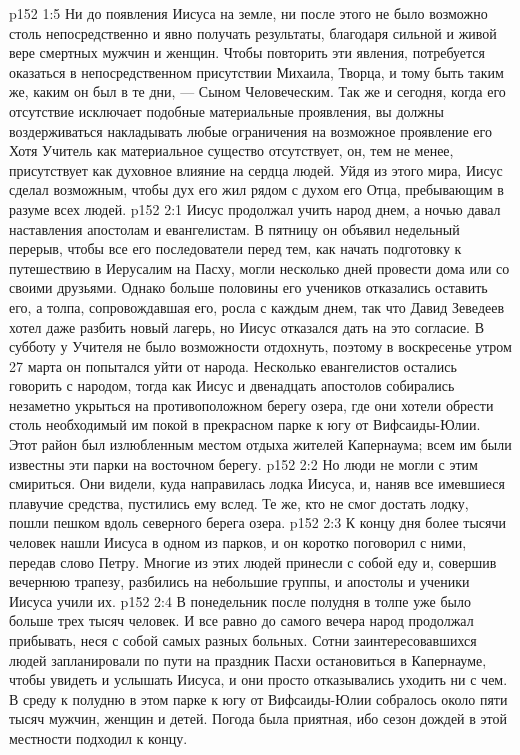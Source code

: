 \vs p152 1:5 Ни до появления Иисуса на земле, ни после этого не было возможно столь непосредственно и явно получать результаты, благодаря сильной и живой вере смертных мужчин и женщин. Чтобы повторить эти явления, потребуется оказаться в непосредственном присутствии Михаила, Творца, и тому быть таким же, каким он был в те дни, --- Сыном Человеческим. Так же и сегодня, когда его отсутствие исключает подобные материальные проявления, вы должны воздерживаться накладывать любые ограничения на возможное проявление его  Хотя Учитель как материальное существо отсутствует, он, тем не менее, присутствует как духовное влияние на сердца людей. Уйдя из этого мира, Иисус сделал возможным, чтобы дух его жил рядом с духом его Отца, пребывающим в разуме всех людей.
\vs p152 2:1 Иисус продолжал учить народ днем, а ночью давал наставления апостолам и евангелистам. В пятницу он объявил недельный перерыв, чтобы все его последователи перед тем, как начать подготовку к путешествию в Иерусалим на Пасху, могли несколько дней провести дома или со своими друзьями. Однако больше половины его учеников отказались оставить его, а толпа, сопровождавшая его, росла с каждым днем, так что Давид Зеведеев хотел даже разбить новый лагерь, но Иисус отказался дать на это согласие. В субботу у Учителя не было возможности отдохнуть, поэтому в воскресенье утром 27 марта он попытался уйти от народа. Несколько евангелистов остались говорить с народом, тогда как Иисус и двенадцать апостолов собирались незаметно укрыться на противоположном берегу озера, где они хотели обрести столь необходимый им покой в прекрасном парке к югу от Вифсаиды\hyp{}Юлии. Этот район был излюбленным местом отдыха жителей Капернаума; всем им были известны эти парки на восточном берегу.
\vs p152 2:2 Но люди не могли с этим смириться. Они видели, куда направилась лодка Иисуса, и, наняв все имевшиеся плавучие средства, пустились ему вслед. Те же, кто не смог достать лодку, пошли пешком вдоль северного берега озера.
\vs p152 2:3 К концу дня более тысячи человек нашли Иисуса в одном из парков, и он коротко поговорил с ними, передав слово Петру. Многие из этих людей принесли с собой еду и, совершив вечернюю трапезу, разбились на небольшие группы, и апостолы и ученики Иисуса учили их.
\vs p152 2:4 В понедельник после полудня в толпе уже было больше трех тысяч человек. И все равно до самого вечера народ продолжал прибывать, неся с собой самых разных больных. Сотни заинтересовавшихся людей запланировали по пути на праздник Пасхи остановиться в Капернауме, чтобы увидеть и услышать Иисуса, и они просто отказывались уходить ни с чем. В среду к полудню в этом парке к югу от Вифсаиды\hyp{}Юлии собралось около пяти тысяч мужчин, женщин и детей. Погода была приятная, ибо сезон дождей в этой местности подходил к концу.
